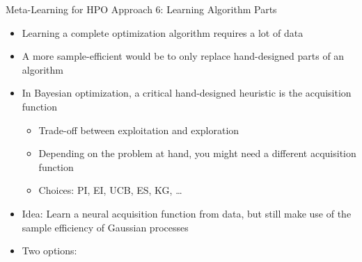 \begin{frame}[c]{Meta-Learning for HPO Approach 6: Learning Algorithm Parts}

\begin{itemize}
	\item Learning a complete optimization algorithm  \alert{requires a lot of data}
	\item A more \alert{sample-efficient} would be to \alert{only replace hand-designed parts} of an algorithm

\bigskip
\pause
	\item In Bayesian optimization, a critical hand-designed heuristic is the acquisition function
	\begin{itemize}
		\item Trade-off between exploitation and exploration
		\item Depending on the problem at hand, you might need a different acquisition function
		\pause
		\item Choices: PI, EI, UCB, ES, KG, \dots 
	\end{itemize}
\pause
\bigskip

    \item \alert{Idea:} Learn a \alert{neural acquisition function} from data, but still make use of the sample efficiency of Gaussian processes 

\pause
\medskip
    \item Two options:

\end{itemize}


\end{frame}

